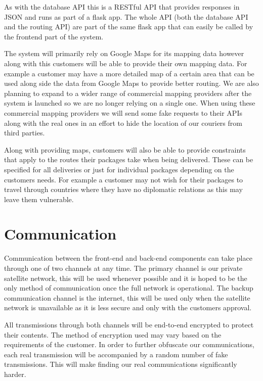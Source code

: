 As with the database API this is a RESTful API that provides responses in JSON and runs as part of a flask app. The whole API (both the database API and the routing API) are part of the same flask app that can easily be called by the frontend part of the system.

The system will primarily rely on Google Maps \cite{GoogleMaps} for its mapping data however along with this customers will be able to provide their own mapping data. For example a customer may have a more detailed map of a certain area that can be used along side the data from Google Maps to provide better routing. We are also planning to expand to a wider range of commercial mapping providers after the system is launched so we are no longer relying on a single one. When using these commercial mapping providers we will send some fake requests to their APIs along with the real ones in an effort to hide the location of our couriers from third parties.

Along with providing maps, customers will also be able to provide constraints that apply to the routes their packages take when being delivered. These can be specified for all deliveries or just for individual packages depending on the customers needs. For example a customer may not wish for their packages to travel through countries where they have no diplomatic relations as this may leave them vulnerable.

\section{Communication} \label{communicationarch}
Communication between the front-end and back-end components can take place through one of two channels at any time. The primary channel is our private satellite network, this will be used whenever possible and it is hoped to be the only method of communication once the full network is operational. The backup communication channel is the internet, this will be used only when the satellite network is unavailable as it is less secure and only with the customers approval. 

All transmissions through both channels will be end-to-end encrypted to protect their contents. The method of encryption used may vary based on the requirements of the customer. In order to further obfuscate our communications, each real transmission will be accompanied by a random number of fake transmissions. This will make finding our real communications significantly harder.

